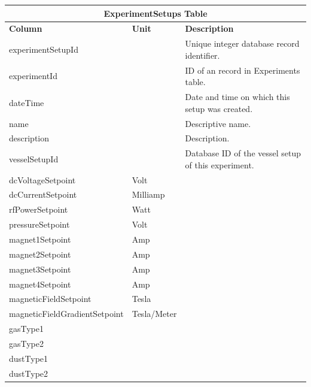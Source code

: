 \begin{table}[h!]
\centering
\begin{tabular}{l l p{7cm}}
\multicolumn{3}{c}{\bf ExperimentSetups Table} \\ \hline
{\bf Column} & {\bf Unit} & {\bf Description}\\ \hline
experimentSetupId & & Unique integer database record identifier.\\ \hline
experimentId & & ID of an record in Experiments table.\\ \hline
dateTime & & Date and time on which this setup was created.\\ \hline
name & & Descriptive name.\\ \hline
description & & Description.\\ \hline
vesselSetupId & & Database ID of the vessel setup of this experiment.\\ \hline
dcVoltageSetpoint & Volt & \\ \hline
dcCurrentSetpoint & Milliamp & \\ \hline
rfPowerSetpoint & Watt & \\ \hline
pressureSetpoint & Volt & \\ \hline
magnet1Setpoint & Amp & \\ \hline
magnet2Setpoint & Amp & \\ \hline
magnet3Setpoint & Amp & \\ \hline
magnet4Setpoint & Amp & \\ \hline
magneticFieldSetpoint & Tesla & \\ \hline
magneticFieldGradientSetpoint & Tesla/Meter & \\ \hline
gasType1 && \\ \hline
gasType2 && \\ \hline
dustType1 && \\ \hline
dustType2 && \\ \hline
\end{tabular}
\end{table}

